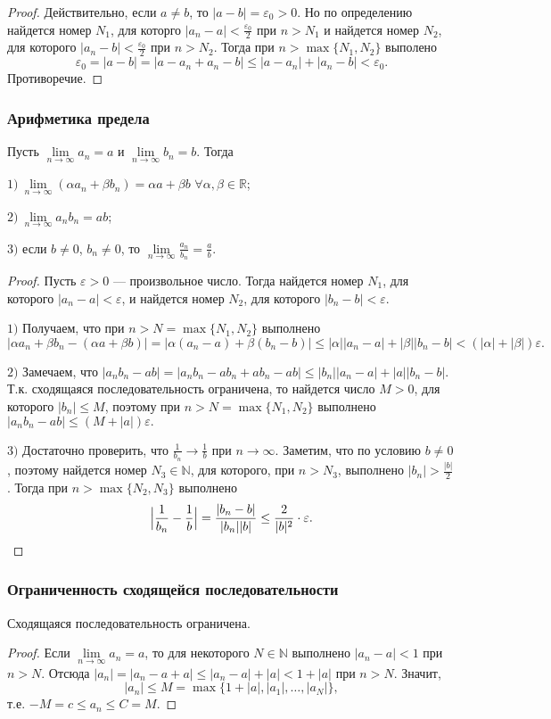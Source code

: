 \documentclass[12pt]{article}
\theoremstyle{definition}
\begin{document}
\begin{proof}
Действительно, если $a\ne b$, то $|a-b|=\varepsilon_0>0$.
Но по определению найдется номер $N_1$,
для которго $|a_n-a|<\frac{\varepsilon_0}{2}$ при $n>N_1$
и найдется номер $N_2$, для которого $|a_n-b|<\frac{\varepsilon_0}{2}$
при $n>N_2$.
Тогда при $n>\max\{N_1, N_2\}$ выполено
$$
\varepsilon_0 = |a-b| = |a - a_n + a_n - b|\le |a-a_n| + |a_n-b|<\varepsilon_0.
$$
Противоречие.
\end{proof}
\subsubsection{Арифметика предела}
Пусть $\lim\limits_{n\to\infty}a_n=a$ и $\lim\limits_{n\to\infty}b_n=b$.
Тогда

$1)\ \lim\limits_{n\to\infty}(\alpha a_n + \beta b_n)=\alpha a+ \beta b$
$\forall \alpha,\beta\in \mathbb{R}$;

$2)\ \lim\limits_{n\to\infty}a_nb_n=ab$;

$3)$ если $b\ne0$, $b_n\ne 0$, то $\lim\limits_{n\to \infty}\frac{a_n}{b_n} = \frac{a}{b}$.

\begin{proof}
Пусть $\varepsilon>0$ --- произвольное число.
Тогда найдется номер $N_1$, для которого $|a_n-a|<\varepsilon$,
и найдется номер $N_2$, для которого $|b_n-b|<\varepsilon$.

$1)$ Получаем, что при $n>N=\max\{N_1, N_2\}$
выполнено
$$
|\alpha a_n +\beta b_n - (\alpha a+\beta b)|
=
|\alpha (a_n-a) +\beta (b_n-b)|
\le
|\alpha| |a_n-a| + |\beta| |b_n-b|< (|\alpha| + |\beta|)\varepsilon.
$$

$2)$ Замечаем, что
$|a_nb_n - ab| = |a_nb_n - ab_n + ab_n - ab|\le
|b_n||a_n - a| + |a||b_n - b|.$
Т.к. сходящаяся последовательность ограничена,
то найдется число $M>0$, для которого
$|b_n|\le M$, поэтому
при $n>N=\max\{N_1, N_2\}$
выполнено
$|a_nb_n - ab|\le (M + |a|)\varepsilon.$

$3)$ Достаточно проверить, что $\frac{1}{b_n}\to \frac{1}{b}$ при $n\to\infty$.
Заметим, что по условию $b\ne 0$, поэтому найдется номер $N_3\in \mathbb{N}$,
для которого, при $n>N_3$, выполнено
$|b_n|>\frac{|b|}{2}$.
Тогда при $n>\max\{N_2, N_3\}$ выполнено
$$
\Bigl|\frac{1}{b_n}-\frac{1}{b}\Bigr| = \frac{|b_n-b|}{|b_n||b|}\le \frac{2}{|b|^2}\cdot \varepsilon.
$$
\end{proof}
\subsubsection{Ограниченность сходящейся последовательности}
Сходящаяся последовательность ограничена.
\begin{proof}
Если $\lim\limits_{n\to\infty}a_n=a$,
то для некоторого $N\in \mathbb{N}$
выполнено
$|a_n-a|<1$ при $n>N$.
Отсюда $|a_n| = |a_n-a+a|\le |a_n-a|+|a|<1+|a|$ при $n>N$.
Значит,
$$
|a_n|\le M=\max\{1+|a|, |a_1|,\ldots, |a_N|\},
$$
т.е. $-M=c\le a_n \le C= M$.
\end{proof}
\end{document}
